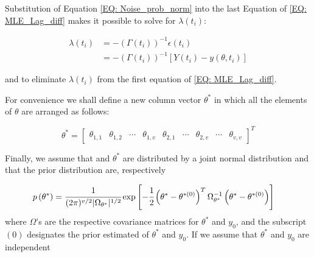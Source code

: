 \documentclass[a4paper,fleqn]{cas-dc}
\begin{document}
Substitution of Equation \ref{EQ: Noise_prob_norm} into the last Equation of \ref{EQ: MLE_Lag_diff} makes it possible to solve for $\lambda(t_i)$:

{\footnotesize
	\begin{align}
		\lambda(t_i) &= -\left( \Gamma(t_i) \right)^{-1} \epsilon(t_i) \nonumber \\
		&= -\left( \Gamma(t_i) \right)^{-1} \left[ Y(t_i) - y(\theta,t_i) \right]
\end{align} }

and to eliminate $\lambda(t_i)$ from the first equation of \ref{EQ: MLE_Lag_diff}.

For convenience we shall define a new column vector $\theta^*$ in which all the elements of $\theta$ are arranged as follows:

{\footnotesize
	\begin{equation}
		\theta^* = \begin{bmatrix}
			\theta_{1,1} & \theta_{1,2} & \cdots & \theta_{1,v} & \theta_{2,1} & \cdots & \theta_{2,v} & \cdots & \theta_{v,v}
		\end{bmatrix}^T	
\end{equation} }

Finally, we assume that and $\theta^*$ are distributed by a joint normal distribution and that the prior distribution are, respectively

{\footnotesize
	\begin{subequations} \label{EQ: MLE_Priors}
		\begin{align}
			&p\left( \theta^* \right) = \cfrac{1}{ (2\pi)^{v/2} |\Omega_{\theta^*}|^{1/2} } \exp \left[ -\cfrac{1}{2} \left( \theta^* - \theta^{*(0)} \right)^T \Omega_{\theta^*}^{-1} \left( \theta^* - \theta^{*(0)} \right) \right] 
		\end{align}
\end{subequations} }
where $\Omega$'s are the respective covariance matrices for $\theta^*$ and $y_0$, and the subscript $(0)$ designates the prior estimated of $\theta^*$ and $y_0$. If we assume that $\theta^*$ and $y_0$ are independent

\end{document}
